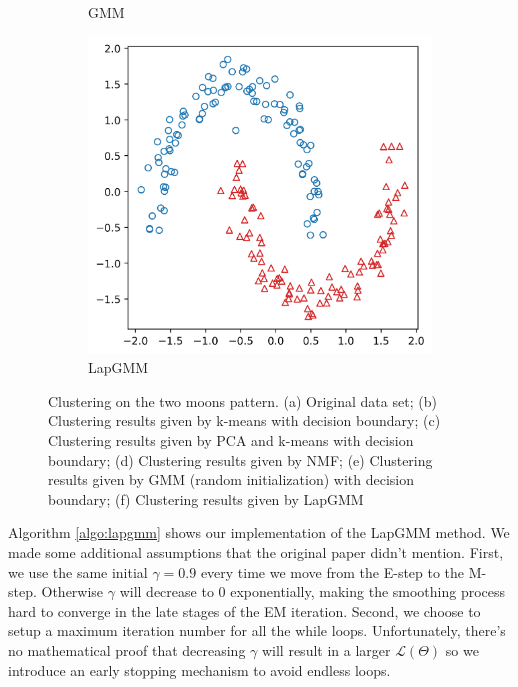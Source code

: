 \documentclass[10pt,journal,compsoc]{IEEEtran}
\begin{document}
\begin{figure}[!t]
\begin{subfigure}{.33\textwidth}
            \caption{GMM}
            \label{fig:gmm}
        \end{subfigure}
        \begin{subfigure}{.33\textwidth}
            \centering
            \includegraphics[width=0.98\linewidth]{figures/LapGMM.png}  
            \caption{LapGMM}
            \label{fig:lapgmm}
        \end{subfigure}
        \caption{Clustering on the two moons pattern. (a) Original data set; (b) Clustering results given by k-means with decision boundary; (c) Clustering results given by PCA and k-means with decision boundary; (d) Clustering results given by NMF; (e) Clustering results given by GMM (random initialization) with decision boundary; (f) Clustering results given by LapGMM}
    \end{figure}

    Algorithm \ref{algo:lapgmm} shows our implementation of the LapGMM method. We made some additional assumptions that the original paper didn't mention. First, we use the same initial $\gamma=0.9$ every time we move from the E-step to the M-step. Otherwise $\gamma$ will decrease to 0 exponentially, making the smoothing process hard to converge in the late stages of the EM iteration. Second, we choose to setup a maximum iteration number for all the while loops. Unfortunately, there's no mathematical proof that decreasing $\gamma$ will result in a larger $\mathcal{L}(\Theta)$ so we introduce an early stopping mechanism to avoid endless loops.
\end{document}
